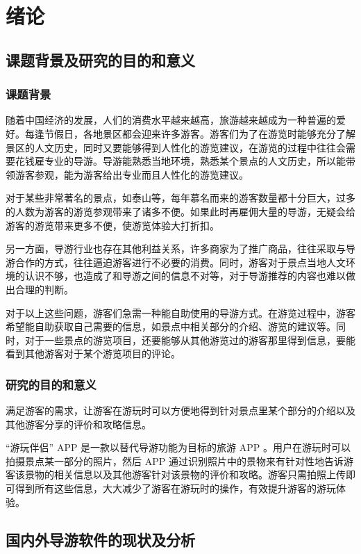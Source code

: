 \chapter{绪论}
	
	\section{课题背景及研究的目的和意义}
	
		\subsection{课题背景}
		
			随着中国经济的发展，人们的消费水平越来越高，旅游越来越成为一种普遍的爱好。每逢节假日，各地景区都会迎来许多游客。游客们为了在游览时能够充分了解景区的人文历史，同时又要能够得到人性化的游览建议，在游览的过程中往往会需要花钱雇专业的导游。导游能熟悉当地环境，熟悉某个景点的人文历史，所以能带领游客参观，能为游客给出专业而且人性化的游览建议。
		
			对于某些非常著名的景点，如泰山等，每年慕名而来的游客数量都十分巨大，过多的人数为游客的游览参观带来了诸多不便。如果此时再雇佣大量的导游，无疑会给游客的游览带来更多不便，使游览体验大打折扣。
		
			另一方面，导游行业也存在其他利益关系，许多商家为了推广商品，往往采取与导游合作的方式，往往逼迫游客进行不必要的消费。同时，游客对于景点当地人文环境的认识不够，也造成了和导游之间的信息不对等，对于导游推荐的内容也难以做出合理的判断。
		
			对于以上这些问题，游客们急需一种能自助使用的导游方式。在游览过程中，游客希望能自助获取自己需要的信息，如景点中相关部分的介绍、游览的建议等。同时，对于一些景点的游览项目，还要能够从其他游览过的游客那里得到信息，要能看到其他游客对于某个游览项目的评论。	
			
		\subsection{研究的目的和意义}	
		
			满足游客的需求，让游客在游玩时可以方便地得到针对景点里某个部分的介绍以及其他游客分享的评价和攻略信息。
  	
  		“游玩伴侣” APP 是一款以替代导游功能为目标的旅游 APP 。用户在游玩时可以拍摄景点某一部分的照片，然后 APP 通过识别照片中的景物来有针对性地告诉游客该景物的相关信息以及其他游客针对该景物的评价和攻略。游客只需拍照上传即可得到所有这些信息，大大减少了游客在游玩时的操作，有效提升游客的游玩体验。
	
	\section{国内外导游软件的现状及分析}
	
